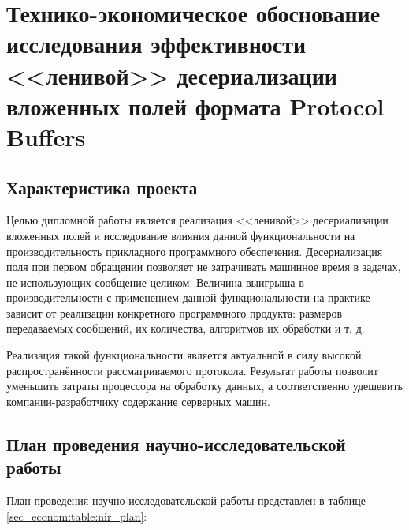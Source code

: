 \section{Технико-экономическое обоснование исследования эффективности <<ленивой>> десериализации вложенных полей формата Protocol Buffers}

\subsection{Характеристика проекта}

Целью дипломной работы является реализация <<ленивой>> десериализации вложенных полей и исследование влияния данной функциональности на производительность прикладного программного обеспечения.
Десериализация поля при первом обращении позволяет не затрачивать машинное время в задачах, не использующих сообщение целиком. 
Величина выигрыша в производительности с применением данной функциональности на практике зависит от реализации конкретного программного продукта: размеров передаваемых сообщений, их количества, алгоритмов их обработки и т. д.

Реализация такой функциональности является актуальной в силу высокой распространённости рассматриваемого протокола. Результат работы позволит уменьшить затраты процессора на обработку данных, а соответственно удешевить компании-разработчику содержание серверных машин.

\subsection{План проведения научно-исследовательской работы}

\newcommand{\teacher}{Руководитель проекта}
\newcommand{\student}{Инженер\--программист}
\newcommand{\teoconsultant}{Экономист по планированию}

План проведения научно-исследовательской работы представлен в таблице \ref{sec_econom:table:nir_plan}:

